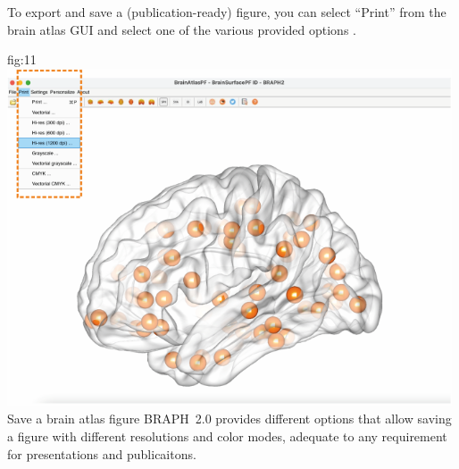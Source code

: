 \documentclass[justified]{tufte-handout}
\begin{document}
To export and save a (publication-ready) figure, you can select ``Print'' from the brain atlas GUI and select one of the various provided options .

	{fig:11}
	{\includegraphics[height=10cm]{tut_ba/fig11.png}}
	{Save a brain atlas figure}
	{
	BRAPH~2.0 provides different options that allow saving a figure with different resolutions and color modes, adequate to any requirement for presentations and publicaitons.
	}
\end{document}
